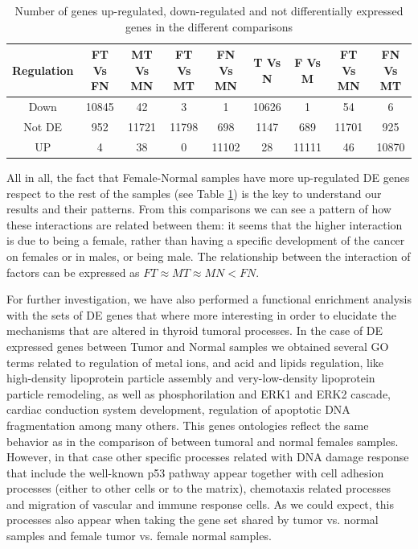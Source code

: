\documentclass[9pt,twocolumn,twoside]{gsajnl}
\begin{document}
\bigskip

\begin{table}[t]
  \centering
  \begin{tabular}{c|cccccccc}
     Regulation & FT Vs FN & MT Vs MN & FT Vs MT & FN Vs MN & T Vs N & F Vs M & FT Vs MN & FN Vs MT \\ \hline
     Down & 10845 & 42 & 3 & 1 & 10626 & 1 & 54 & 6 \\ 
     Not DE & 952 & 11721 & 11798 & 698 & 1147 & 689 & 11701 & 925 \\
     UP & 4 & 38 & 0 & 11102 & 28 & 11111 & 46 & 10870
  \end{tabular}
  \caption{Number of genes up-regulated, down-regulated and not differentially expressed genes in the different comparisons}
  \label{tab:1}
\end{table}

                     
All in all, the fact that Female-Normal samples have more up-regulated DE genes respect to the rest of the samples (see Table \ref{tab:1}) 
is the key to understand our results and their patterns. From this comparisons we can see a pattern of how these interactions are related between them: it seems that the higher interaction is due to being a female, rather than having a specific development of the cancer on females or in males, or being male. The relationship between the interaction of factors can be expressed as $FT \approx MT \approx MN < FN$.

For further investigation, we have also performed a functional enrichment analysis with the sets of DE genes that where more interesting in order to elucidate the mechanisms that are altered in thyroid tumoral processes. In the case of DE expressed genes between Tumor and Normal samples we obtained several GO terms  %
related to regulation of metal ions, and acid and lipids regulation, like high-density lipoprotein particle assembly and very-low-density lipoprotein particle remodeling, as well as phosphorilation and ERK1 and ERK2 cascade, cardiac conduction system development, regulation of apoptotic DNA fragmentation among many others. This genes ontologies reflect the same behavior as in the comparison of between tumoral and normal females samples. %
However, in that case other specific processes related with DNA damage response that include the well-known p53 pathway appear together with cell adhesion processes (either to other cells or to the matrix), chemotaxis related processes and migration of vascular and immune response cells. 
As we could expect, this processes also appear when taking the gene set shared by tumor vs. normal samples and female tumor vs. female normal samples. 
	 	
\end{document}

